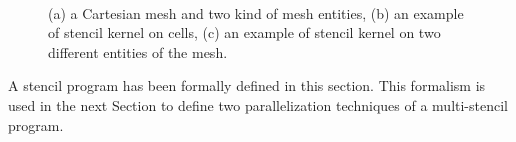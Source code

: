 \begin{figure}
\begin{center}
\\
\hspace{10pt}
\vspace{20pt}
\end{center}
\caption{(a) a Cartesian mesh and two kind of mesh entities, (b) an example of stencil kernel on cells, (c) an example of stencil kernel on two different entities of the mesh.}
\label{fig:gspmsp}
\end{figure}

A stencil program has been formally defined in this section. This formalism is used in the next Section to define two parallelization techniques of a multi-stencil program.


